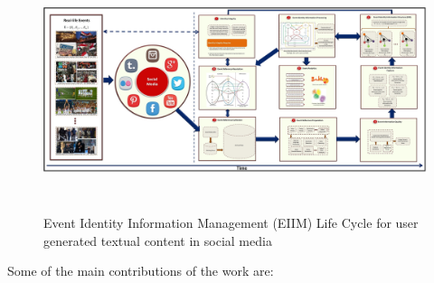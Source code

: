 \documentclass[11pt, oneside]{Thesis} %
\begin{document}
\begin{figure}[htbp]
\label{eiim}
  \caption{Event Identity Information Management (EIIM) Life Cycle for user generated textual content in social media}
  \centering
    \includegraphics[width=15.5cm,height=7cm]{Figures/EIIM.jpg}
\end{figure}

Some of the main contributions of the work are:
\end{document}
